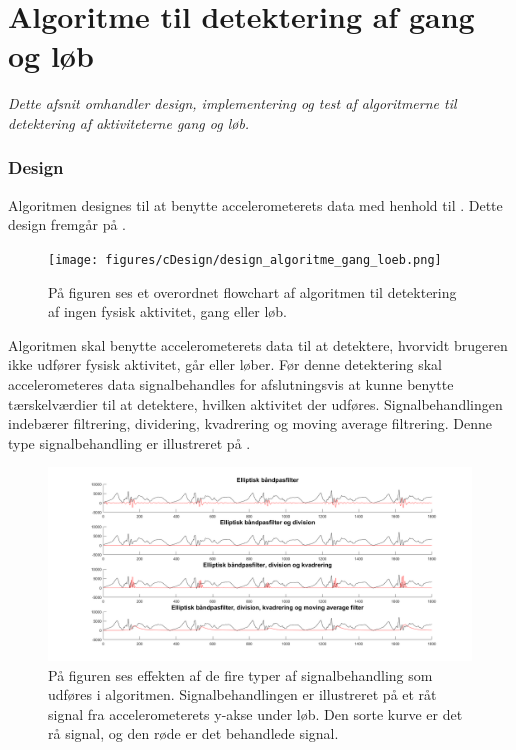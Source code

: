 \section{Algoritme til detektering af gang og løb}\label{sec:algogangloeb}
\textit{Dette afsnit omhandler design, implementering og test af algoritmerne til detektering af aktiviteterne gang og løb.} 

\subsubsection{Design} \label{design_algo_g_l}
Algoritmen designes til at benytte accelerometerets data med henhold til . Dette design fremgår på .
\begin{figure}[H]
	\centering
	\texttt{[image: figures/cDesign/design\_algoritme\_gang\_loeb.png]}
	\caption{På figuren ses et overordnet flowchart af algoritmen til detektering af ingen fysisk aktivitet, gang eller løb.}
	\label{fig:design_algoritme_gang_loeb}
\end{figure}\vspace{-0.25cm}
Algoritmen skal benytte accelerometerets data til at detektere, hvorvidt brugeren ikke udfører fysisk aktivitet, går eller løber. Før denne detektering skal accelerometeres data signalbehandles for afslutningsvis at kunne benytte tærskelværdier til at detektere, hvilken aktivitet der udføres. Signalbehandlingen indebærer filtrering, dividering, kvadrering og moving average filtrering. Denne type signalbehandling er illustreret på .
\begin{figure}[H]
	\centering
	\includegraphics[width=1\textwidth]{figures/cDesign/signalbehandling_psoc.png}
	\caption{På figuren ses effekten af de fire typer af signalbehandling som udføres i algoritmen. Signalbehandlingen er illustreret på et råt signal fra accelerometerets y-akse under løb. Den sorte kurve er det rå signal, og den røde er det behandlede signal.}
	\label{fig:algoritme_behandling}
\end{figure}\vspace{-0.25cm}
